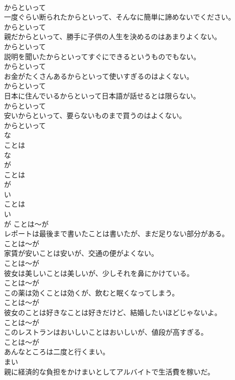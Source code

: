 \documentclass[8pt]{extreport}
\begin{document}
\begin{CJK}{UTF8}{min}
\\	からといって
\\	一度ぐらい断られたからといって、そんなに簡単に諦めないでください。	
\\	からといって
\\	親だからといって、勝手に子供の人生を決めるのはあまりよくない。	
\\	からといって
\\	説明を聞いたからといってすぐにできるというものでもない。	
\\	からといって
\\	お金がたくさんあるからといって使いすぎるのはよくない。	
\\	からといって
\\	日本に住んでいるからといって日本語が話せるとは限らない。	
\\	からといって
\\	安いからといって、要らないものまで買うのはよくない。	
\\	からといって
\\	な
\\	ことは 
\\	な
\\	が	
\\	ことは 
\\	が	
\\	い
\\	ことは 
\\	い
\\	が	ことは～が
\\	レポートは最後まで書いたことは書いたが、まだ足りない部分がある。	
\\	ことは～が
\\	家賃が安いことは安いが、交通の便がよくない。	
\\	ことは～が
\\	彼女は美しいことは美しいが、少しそれを鼻にかけている。	
\\	ことは～が
\\	この薬は効くことは効くが、飲むと眠くなってしまう。	
\\	ことは～が
\\	彼女のことは好きなことは好きだけど、結婚したいほどじゃないよ。	
\\	ことは～が
\\	このレストランはおいしいことはおいしいが、値段が高すぎる。	
\\	ことは～が
\\	あんなところは二度と行くまい。	
\\	まい
\\	親に経済的な負担をかけまいとしてアルバイトで生活費を稼いだ。	

\end{CJK}
\end{document}
